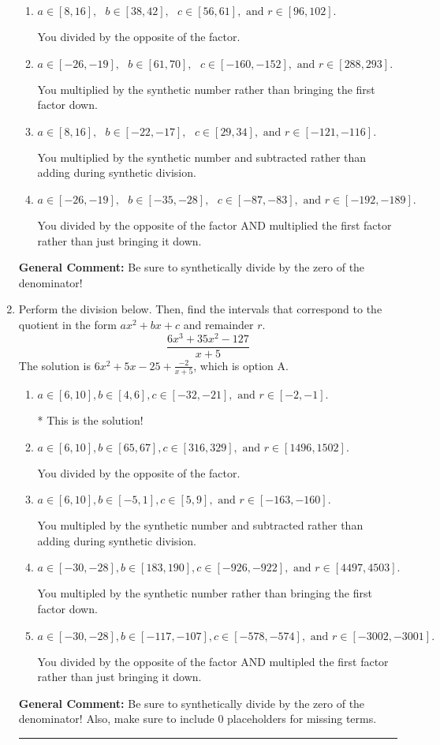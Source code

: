 \documentclass{extbook}[14pt]
\newcommand{\litem}[1]{\item #1

\rule{\textwidth}{0.4pt}}
\begin{document}
\begin{enumerate}
{\begin{enumerate}[label=\Alph*.]
* This is the solution!
\item \( a \in [8, 16], \text{   } b \in [38, 42], \text{   } c \in [56, 61], \text{   and   } r \in [96, 102]. \)

 You divided by the opposite of the factor.
\item \( a \in [-26, -19], \text{   } b \in [61, 70], \text{   } c \in [-160, -152], \text{   and   } r \in [288, 293]. \)

 You multiplied by the synthetic number rather than bringing the first factor down.
\item \( a \in [8, 16], \text{   } b \in [-22, -17], \text{   } c \in [29, 34], \text{   and   } r \in [-121, -116]. \)

 You multiplied by the synthetic number and subtracted rather than adding during synthetic division.
\item \( a \in [-26, -19], \text{   } b \in [-35, -28], \text{   } c \in [-87, -83], \text{   and   } r \in [-192, -189]. \)

 You divided by the opposite of the factor AND multiplied the first factor rather than just bringing it down.
\end{enumerate}

\textbf{General Comment:} Be sure to synthetically divide by the zero of the denominator!
}
\litem{
Perform the division below. Then, find the intervals that correspond to the quotient in the form $ax^2+bx+c$ and remainder $r$.
\[ \frac{6x^{3} +35 x^{2} -127}{x + 5} \]The solution is \( 6x^{2} +5 x -25 + \frac{-2}{x + 5} \), which is option A.\begin{enumerate}[label=\Alph*.]
\item \( a \in [6, 10], b \in [4, 6], c \in [-32, -21], \text{ and } r \in [-2, -1]. \)

* This is the solution!
\item \( a \in [6, 10], b \in [65, 67], c \in [316, 329], \text{ and } r \in [1496, 1502]. \)

 You divided by the opposite of the factor.
\item \( a \in [6, 10], b \in [-5, 1], c \in [5, 9], \text{ and } r \in [-163, -160]. \)

 You multipled by the synthetic number and subtracted rather than adding during synthetic division.
\item \( a \in [-30, -28], b \in [183, 190], c \in [-926, -922], \text{ and } r \in [4497, 4503]. \)

 You multipled by the synthetic number rather than bringing the first factor down.
\item \( a \in [-30, -28], b \in [-117, -107], c \in [-578, -574], \text{ and } r \in [-3002, -3001]. \)

 You divided by the opposite of the factor AND multipled the first factor rather than just bringing it down.
\end{enumerate}

\textbf{General Comment:} Be sure to synthetically divide by the zero of the denominator! Also, make sure to include 0 placeholders for missing terms.
}
\end{enumerate}
\end{document}
